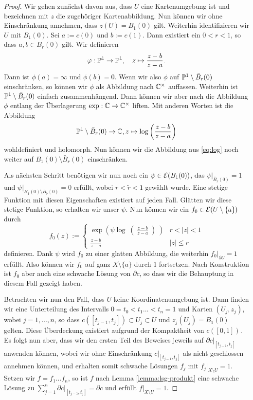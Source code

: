 \begin{proof}
  Wir gehen zunächst davon aus, dass $U$ eine Kartenumgebung ist und
  bezeichnen mit $z$ die zugehöriger Kartenabbildung. Nun können wir
  ohne Einschränkung annehmen, dass $z(U) = B_1(0)$ gilt. Weiterhin
  identifizieren wir $U$ mit $B_1(0)$. Sei $a := c(0)$ und $b :=
  c(1)$. Dann existiert ein $0 < r < 1$, so dass $a, b \in B_r(0)$
  gilt. Wir definieren
  \[
  \phi: \P^1 \ra \P^1, \quad z \mapsto \frac{z-b}{z-a}.
  \]
  Dann ist $\phi(a) = \infty$ und $\phi(b) = 0$. Wenn wir also $\phi$
  auf $\P^1 \setminus \bar B_r(0)$ einschränken, so können wir $\phi$
  als Abbildung nach $\C^\times$ auffassen. Weiterhin ist $\P^1
  \setminus \bar B_r(0)$ einfach zusammenhängend. Dann können wir aber
  nach \cite[Beispiel 4.18]{For} die Abbildung $\phi$ entlang der
  Überlagerung $\exp: \C \ra \C^\times$ liften. Mit anderen Worten ist
  die Abbildung
  \begin{align}
    \label{eq:log}
  \P^1\setminus \bar B_r(0) \ra \C, z \mapsto \log \left (
    \frac{z-b}{z-a} \right )
  \end{align}
  wohldefiniert und holomorph. Nun können wir die Abbildung aus
  \eqref{eq:log} noch weiter auf $B_1(0) \setminus \bar B_r(0)$
  einschränken.

  Als nächsten Schritt benötigen wir nun noch ein $\psi \in
  \diff(B_1(0))$, das $\psi|_{\bar B_r(0)} = 1$ und $\psi|_{B_1(0)
    \setminus \bar B_{\tilde r}(0)} = 0$ erfüllt, wobei $r <
  \tilde r <1$
  gewählt wurde. Eine stetige Funktion mit diesen Eigenschaften
  existiert auf jeden Fall. Glätten wir diese stetige Funktion, so
  erhalten wir unser $\psi$. Nun können wir ein $f_0 \in \diff(U
  \setminus \{a\})$ durch
  \[
  f_0(z) :=
  \begin{cases}
    \exp \left (\psi \log \middle ( \frac{z-b}{z-a} \middle ) \right
    ) & r < |z| <1 \\
    \frac{z-b}{z-a} & |z| \leq r
  \end{cases}
  \]
  definieren. Dank $\psi$ wird $f_0$ zu einer glatten Abbildung, die
  weiterhin $f_0|_{\partial U} = 1$ erfüllt. Also können wir
  $f_0$ auf ganz $X \setminus \{a\}$ durch 1 fortsetzen. Nach
  Konstruktion ist $f_0$ aber auch eine schwache Lösung von
  $\partial c$, so dass wir die Behauptung in diesem Fall gezeigt
  haben.

  Betrachten wir nun den Fall, dass $U$ keine Koordinatenumgebung
  ist. Dann finden wir eine Unterteilung des Intervalls $0= t_0 <
  t_1 \dots < t_n = 1$ und Karten $(U_j,z_j)$, wobei $j = 1, \dots,
  n$, so dass $c([t_{j-1}, t_j]) \subset U_j \subset U$ und
  $z_j(U_j) = B_1(0)$ gelten. Diese Überdeckung existiert aufgrund
  der Kompaktheit von $c([0,1])$. Es folgt nun aber, dass wir den
  ersten Teil des Beweises jeweils auf $\partial c|_{[t_{j-1},t_j]}$
  anwenden können, wobei wir ohne Einschränkung $c|_{[t_{j-1},t_j]}$
  als nicht geschlossen annehmen können, und erhalten somit schwache Lösungen $f_j$ mit $f_j|_{X
    \setminus U} = 1$.
  Setzen wir $f = f_1 \dots f_n$, so ist $f$ nach Lemma
  \ref{lemma:lsg-produkt} eine schwache Lösung zu
  $\sum_{j=1}^n \partial c|_{[t_{j-1},t_j]} = \partial c$ und
  erfüllt $f|_{X \setminus U} = 1$.
\end{proof}

